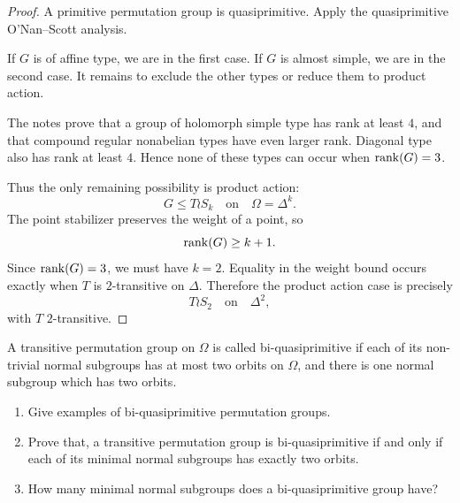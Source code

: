 \begin{proof}
A primitive permutation group is quasiprimitive. Apply the quasiprimitive
O'Nan--Scott analysis.

If \(G\) is of affine type, we are in the first case. If \(G\) is almost simple,
we are in the second case. It remains to exclude the other types or reduce them
to product action.

The notes prove that a group of holomorph simple type has rank at least \(4\),
and that compound regular nonabelian types have even larger rank. Diagonal type
also has rank at least \(4\). Hence none of these types can occur when
\(\operatorname{rank}(G)=3\).

Thus the only remaining possibility is product action:
\[
    G\leq T\wr S_k
    \quad\text{on}\quad
    \Omega=\Delta^k.
\]
The point stabilizer preserves the weight of a point, so
\[
    \operatorname{rank}(G)\geq k+1.
\]
Since \(\operatorname{rank}(G)=3\), we must have \(k=2\). Equality in the weight bound occurs
exactly when \(T\) is \(2\)-transitive on \(\Delta\). Therefore the product
action case is precisely
\[
    T\wr S_2
    \quad\text{on}\quad
    \Delta^2,
\]
with \(T\) \(2\)-transitive.
\end{proof}

\begin{exercise}
A transitive permutation group on \(\Omega\) is called bi-quasiprimitive if each
of its non-trivial normal subgroups has at most two orbits on \(\Omega\), and
there is one normal subgroup which has two orbits.
\begin{enumerate}[label=(\alph*)]
    \item Give examples of bi-quasiprimitive permutation groups.
    \item Prove that, a transitive permutation group is bi-quasiprimitive if and
    only if each of its minimal normal subgroups has exactly two orbits.
    \item How many minimal normal subgroups does a bi-quasiprimitive group have?
\end{enumerate}
\end{exercise}

